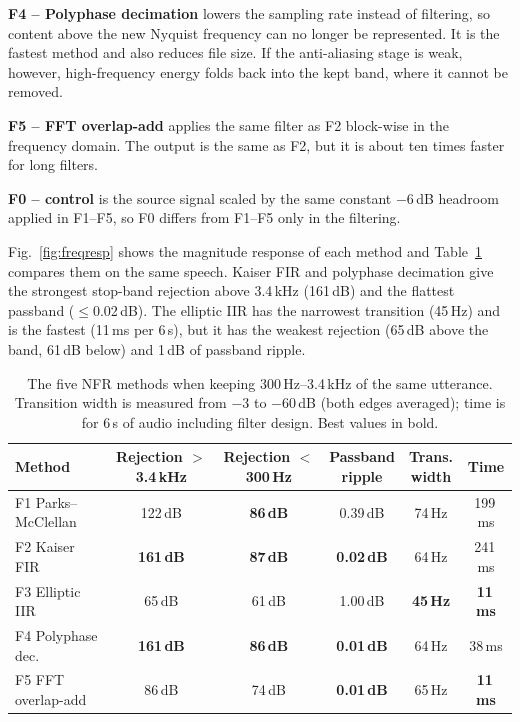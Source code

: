 \documentclass[conference]{IEEEtran}
\begin{document}
\textbf{F4 -- Polyphase decimation} lowers the sampling rate instead of
filtering, so content above the new Nyquist frequency can no longer be
represented. It is the fastest method and also reduces file size. If the
anti-aliasing stage is weak, however, high-frequency energy folds back
into the kept band, where it cannot be removed.

\textbf{F5 -- FFT overlap-add} applies the same filter as F2 block-wise in
the frequency domain. The output is the same as F2, but it is about ten
times faster for long filters.

\textbf{F0 -- control} is the source signal scaled by the same constant
$-6$\,dB headroom applied in F1--F5, so F0 differs from F1--F5 only in the
filtering.

Fig.~\ref{fig:freqresp} shows the magnitude response of each method and
Table~\ref{tab:filters} compares them on the same speech. Kaiser FIR and
polyphase decimation give the strongest stop-band rejection above 3.4\,kHz
(161\,dB) and the flattest passband ($\le$0.02\,dB). The elliptic IIR has
the narrowest transition (45\,Hz) and is the fastest (11\,ms per 6\,s),
but it has the weakest rejection (65\,dB above the band, 61\,dB below) and
1\,dB of passband ripple.

\begin{table}[t]
\centering
\caption{The five NFR methods when keeping 300\,Hz--3.4\,kHz of the same utterance. Transition width is measured from $-3$ to $-60$\,dB (both edges averaged); time is for 6\,s of audio including filter design. Best values in bold.}
\label{tab:filters}
\setlength{\tabcolsep}{3pt}
\begin{tabular}{lccccc}
\toprule
Method & \makecell{Rejection\\$>$3.4\,kHz} & \makecell{Rejection\\$<$300\,Hz} & \makecell{Passband\\ripple} & \makecell{Trans.\\width} & Time \\
\midrule
F1 Parks--McClellan & 122\,dB & \textbf{86\,dB} & 0.39\,dB & 74\,Hz & 199\,ms \\
F2 Kaiser FIR       & \textbf{161\,dB} & \textbf{87\,dB} & \textbf{0.02\,dB} & 64\,Hz & 241\,ms \\
F3 Elliptic IIR     & 65\,dB & 61\,dB & 1.00\,dB & \textbf{45\,Hz} & \textbf{11\,ms} \\
F4 Polyphase dec.   & \textbf{161\,dB} & \textbf{86\,dB} & \textbf{0.01\,dB} & 64\,Hz & 38\,ms \\
F5 FFT overlap-add  & 86\,dB & 74\,dB & \textbf{0.01\,dB} & 65\,Hz & \textbf{11\,ms} \\
\bottomrule
\end{tabular}
\end{table}
\end{document}
